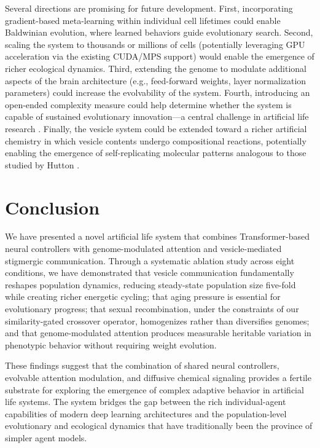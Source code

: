 \documentclass[10pt,twocolumn]{article}
\begin{document}
Several directions are promising for future development.
First, incorporating gradient-based meta-learning within individual cell lifetimes could enable Baldwinian evolution, where learned behaviors guide evolutionary search.
Second, scaling the system to thousands or millions of cells (potentially leveraging GPU acceleration via the existing CUDA/MPS support) would enable the emergence of richer ecological dynamics.
Third, extending the genome to modulate additional aspects of the brain architecture (e.g., feed-forward weights, layer normalization parameters) could increase the evolvability of the system.
Fourth, introducing an open-ended complexity measure \cite{lehman2011evolving} could help determine whether the system is capable of sustained evolutionary innovation---a central challenge in artificial life research \cite{packard2019overview,taylor2016open}.
Finally, the vesicle system could be extended toward a richer artificial chemistry \cite{banzhaf2015artificial} in which vesicle contents undergo compositional reactions, potentially enabling the emergence of self-replicating molecular patterns analogous to those studied by Hutton \cite{hutton2002evolvable}.


\section{Conclusion}
\label{sec:conclusion}

We have presented a novel artificial life system that combines Transformer-based neural controllers with genome-modulated attention and vesicle-mediated stigmergic communication.
Through a systematic ablation study across eight conditions, we have demonstrated that vesicle communication fundamentally reshapes population dynamics, reducing steady-state population size five-fold while creating richer energetic cycling; that aging pressure is essential for evolutionary progress; that sexual recombination, under the constraints of our similarity-gated crossover operator, homogenizes rather than diversifies genomes; and that genome-modulated attention produces measurable heritable variation in phenotypic behavior without requiring weight evolution.

These findings suggest that the combination of shared neural controllers, evolvable attention modulation, and diffusive chemical signaling provides a fertile substrate for exploring the emergence of complex adaptive behavior in artificial life systems.
The system bridges the gap between the rich individual-agent capabilities of modern deep learning architectures and the population-level evolutionary and ecological dynamics that have traditionally been the province of simpler agent models.
\end{document}
